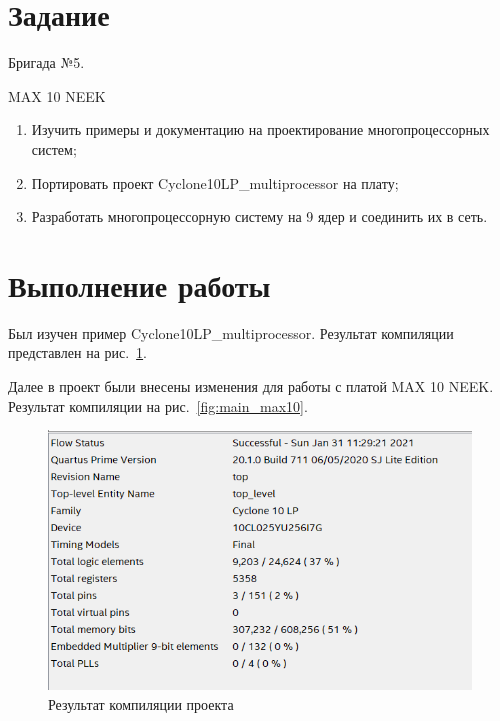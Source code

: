 \documentclass[a4paper,14pt]{article}
\begin{document}
    
    \tableofcontents
    \pagebreak


    \section{Задание}

    Бригада №5.

    MAX 10 NEEK	

    \begin{enumerate}
        \item Изучить примеры и документацию на проектирование многопроцессорных систем;
        \item Портировать проект Cyclone10LP\_multiprocessor на плату;
        \item Разработать многопроцессорную систему на 9 ядер и соединить их в сеть.
    \end{enumerate}


    \section{Выполнение работы}

	Был изучен пример Cyclone10LP\_multiprocessor.
	Результат компиляции представлен на рис.~\ref{fig:main_cyclone}.
	
	Далее в проект были внесены изменения для работы с платой MAX 10 NEEK.
	Результат компиляции на рис.~\ref{fig:main_max10}.
	
    \begin{figure}[H]
		\centering
		\includegraphics[width=\linewidth]{images/main_cyclone}
		\caption{Результат компиляции проекта}
		\label{fig:main_cyclone}
	\end{figure}
\end{document}
